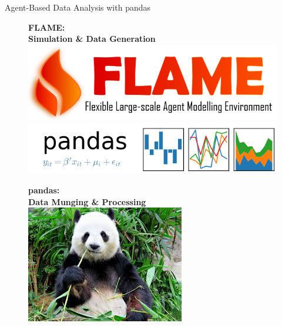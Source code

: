 \documentclass[9pt,sansserif]{beamer}
\begin{document}
\begin{frame}{Agent-Based Data Analysis with pandas}\small

\begin{figure}[hb!]
\centering\leavevmode
\graphicspath{{../png/}}
%
\begin{minipage}{16.5cm}
\begin{minipage}{6cm}
\centering\leavevmode
{\bf FLAME:\\Simulation \& Data Generation}
\vspace{.5cm}\\
\includegraphics[scale=.3]{./png/flame.png}\\
 {\vspace{.8cm}\includegraphics[scale=.25]{./png/python-pandas-screenshot.png}}
\end{minipage}
%
\begin{minipage}{5cm}
\centering\leavevmode
{\bf pandas:\\Data Munging \& Processing}
\vspace{.5cm}\\
\includegraphics[scale=.5]{./png/panda-eat.jpg}\\

\end{minipage}
\end{minipage}
\end{figure}
\end{frame}
\end{document}
